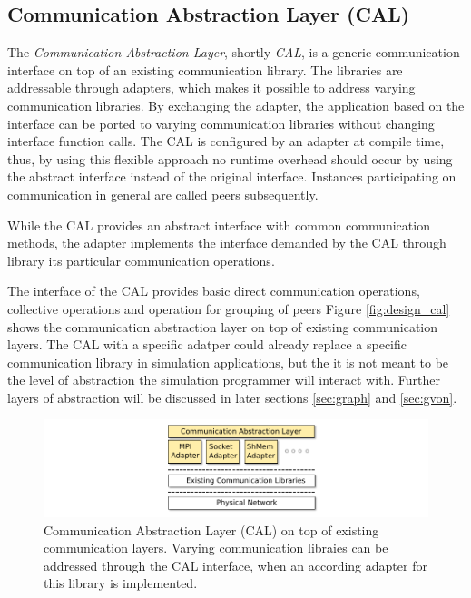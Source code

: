 \subsection{Communication Abstraction Layer (CAL)}
\label{sec:cal}

The \textit{Communication Abstraction Layer}, shortly \textit{CAL}, is
a generic communication interface on top of an existing communication
library. The libraries are addressable through
adapters, which makes it possible to address varying communication
libraries. By exchanging the adapter, the application based on the
interface can be ported to varying communication libraries without
changing interface function calls. The CAL is configured by an adapter
at compile time, thus, by using this flexible approach no runtime
overhead should occur by using the abstract interface instead of the
original interface. Instances participating on communication in general are
called peers subsequently.

While the CAL provides an abstract interface with common communication
methods, the adapter implements the interface demanded by the CAL
through library its particular communication operations.

The interface of the CAL provides basic direct communication
operations, collective operations and operation for grouping of peers
Figure \ref{fig:design_cal} shows the communication abstraction layer
on top of existing communication layers.  The CAL with a specific
adatper could already replace a specific communication library in
simulation applications, but the it is not meant to be the level of
abstraction the simulation programmer will interact with. Further
layers of abstraction will be discussed in later sections
\ref{sec:graph} and \ref{sec:gvon}.

\begin{figure}[H]
  \centering
  \includegraphics[width=\textwidth]{graphics/30_design_cal}
  \caption{Communication Abstraction Layer (CAL) on top of existing
    communication layers. Varying communication libraies can be
    addressed through the CAL interface, when an according adapter for
    this library is implemented.}
  \label{fig:cal}
\end{figure}

